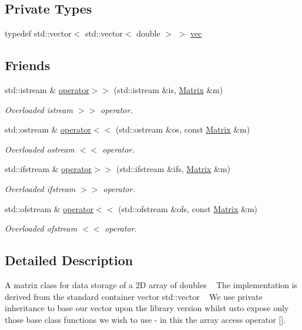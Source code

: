 \subsection*{Private Types}
\begin{DoxyCompactItemize}
\item 
typedef std\+::vector$<$ std\+::vector$<$ double $>$ $>$ \hyperlink{classMatrix_a0027109b5516f852be28259267c6c637}{vec}
\end{DoxyCompactItemize}
\subsection*{Friends}
\begin{DoxyCompactItemize}
\item 
std\+::istream \& \hyperlink{classMatrix_a3d6c1dcfc038804f4c08687f4f37f48b}{operator$>$$>$} (std\+::istream \&is, \hyperlink{classMatrix}{Matrix} \&m)
\begin{DoxyCompactList}\small\item\em Overloaded istream $>$$>$ operator. \end{DoxyCompactList}\item 
std\+::ostream \& \hyperlink{classMatrix_a060711074cb5bcaf4e75498bc040c4b7}{operator$<$$<$} (std\+::ostream \&os, const \hyperlink{classMatrix}{Matrix} \&m)
\begin{DoxyCompactList}\small\item\em Overloaded ostream $<$$<$ operator. \end{DoxyCompactList}\item 
std\+::ifstream \& \hyperlink{classMatrix_aa5699a0bdf0ee014f083ff8a76629d21}{operator$>$$>$} (std\+::ifstream \&ifs, \hyperlink{classMatrix}{Matrix} \&m)
\begin{DoxyCompactList}\small\item\em Overloaded ifstream $>$$>$ operator. \end{DoxyCompactList}\item 
std\+::ofstream \& \hyperlink{classMatrix_aa574249d63b390cf1108d6e82047ef61}{operator$<$$<$} (std\+::ofstream \&ofs, const \hyperlink{classMatrix}{Matrix} \&m)
\begin{DoxyCompactList}\small\item\em Overloaded ofstream $<$$<$ operator. \end{DoxyCompactList}\end{DoxyCompactItemize}


\subsection{Detailed Description}
A matrix class for data storage of a 2D array of doubles ~\newline
 The implementation is derived from the standard container vector std\+::vector ~\newline
 We use private inheritance to base our vector upon the library version whilst  usto expose only those base class functions we wish to use -\/ in this  the array access operator \mbox{[}\mbox{]}. 


